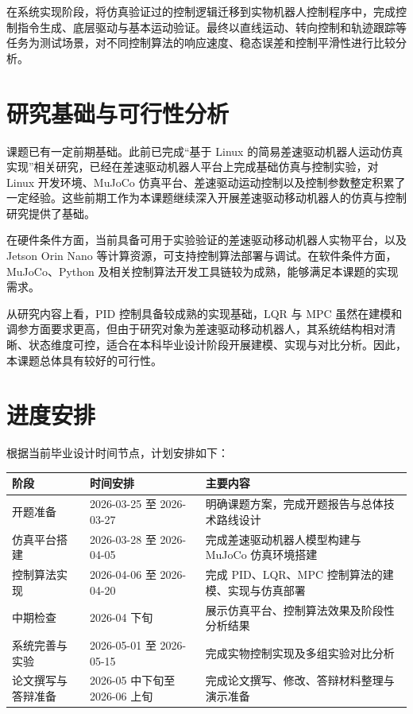 \documentclass[12pt,a4paper]{ctexart}
\begin{document}
在系统实现阶段，将仿真验证过的控制逻辑迁移到实物机器人控制程序中，完成控制指令生成、底层驱动与基本运动验证。最终以直线运动、转向控制和轨迹跟踪等任务为测试场景，对不同控制算法的响应速度、稳态误差和控制平滑性进行比较分析。

\section{研究基础与可行性分析}
课题已有一定前期基础。此前已完成“基于 Linux 的简易差速驱动机器人运动仿真实现”相关研究，已经在差速驱动机器人平台上完成基础仿真与控制实验，对 Linux 开发环境、MuJoCo 仿真平台、差速驱动运动控制以及控制参数整定积累了一定经验。这些前期工作为本课题继续深入开展差速驱动移动机器人的仿真与控制研究提供了基础。

在硬件条件方面，当前具备可用于实验验证的差速驱动移动机器人实物平台，以及 Jetson Orin Nano 等计算资源，可支持控制算法部署与调试。在软件条件方面，MuJoCo、Python 及相关控制算法开发工具链较为成熟，能够满足本课题的实现需求。

从研究内容上看，PID 控制具备较成熟的实现基础，LQR 与 MPC 虽然在建模和调参方面要求更高，但由于研究对象为差速驱动移动机器人，其系统结构相对清晰、状态维度可控，适合在本科毕业设计阶段开展建模、实现与对比分析。因此，本课题总体具有较好的可行性。

\section{进度安排}
根据当前毕业设计时间节点，计划安排如下：

\begin{longtable}{p{3cm}p{4cm}p{7cm}}
\toprule
阶段 & 时间安排 & 主要内容 \\
\midrule
开题准备 & 2026-03-25 至 2026-03-27 & 明确课题方案，完成开题报告与总体技术路线设计 \\
仿真平台搭建 & 2026-03-28 至 2026-04-05 & 完成差速驱动机器人模型构建与 MuJoCo 仿真环境搭建 \\
控制算法实现 & 2026-04-06 至 2026-04-20 & 完成 PID、LQR、MPC 控制算法的建模、实现与仿真部署 \\
中期检查 & 2026-04 下旬 & 展示仿真平台、控制算法效果及阶段性分析结果 \\
系统完善与实验 & 2026-05-01 至 2026-05-15 & 完成实物控制实现及多组实验对比分析 \\
论文撰写与答辩准备 & 2026-05 中下旬至 2026-06 上旬 & 完成论文撰写、修改、答辩材料整理与演示准备 \\
\bottomrule
\end{longtable}
\end{document}
